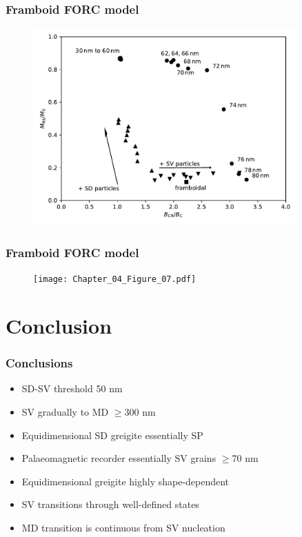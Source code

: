 \documentclass{beamer}
\begin{document}
        \begin{frame}
          \frametitle{Framboid FORC model}
          \begin{figure}[htb]
            \centering
            \includegraphics[width=0.9\textwidth]{Chapter_04_Figure_06.pdf}
          \end{figure}
        \end{frame}

        \begin{frame}
          \frametitle{Framboid FORC model}
          \begin{figure}[htb]
            \centering
            \texttt{[image: Chapter\_04\_Figure\_07.pdf]}
          \end{figure}
        \end{frame}


	\section{Conclusion}
		\begin{frame}
			\frametitle{Conclusions}
			\begin{itemize}
                          \item SD-SV threshold \alert{50 nm}
                          \item SV gradually to MD \alert{$\geq$300 nm}
                          \item Equidimensional \alert{SD greigite essentially SP}
                          \item Palaeomagnetic recorder essentially \alert{SV grains $\geq$70 nm}
                          \item Equidimensional greigite \alert{highly shape-dependent}
			  \item SV transitions through \alert{well-defined states}
                          \item MD transition is continuous from SV nucleation
			\end{itemize}
		\end{frame}
\end{document}
